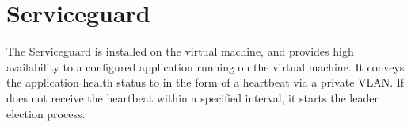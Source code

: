 \section{Serviceguard} \label{sec:guard}

The Serviceguard is installed on the virtual machine, and provides high availability to
a configured application running on the virtual machine. It conveys the application 
health status to \smrsystem in the form of a heartbeat via a private VLAN. If \smrsystem 
does not receive the heartbeat within a specified interval, it starts the leader election 
process. 
